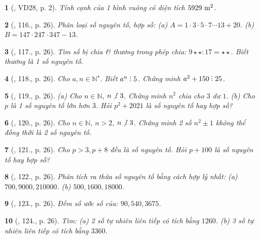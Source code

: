 \documentclass{article}
\newtheorem{baitoan}{}
\DeclareRobustCommand{\divby}{%
	\mathrel{\vbox{\baselineskip.65ex\lineskiplimit0pt\hbox{.}\hbox{.}\hbox{.}}}%
}
\begin{document}
\begin{baitoan}[\cite{Tuyen_Toan_6}, VD28, p. 2]
	Tính cạnh của 1 hình vuông có diện tích $\rm5929\ m^2$.
\end{baitoan}

\begin{baitoan}[\cite{Tuyen_Toan_6}, 116., p. 26]
	Phân loại số nguyên tố, hợp số: (a) $A = 1\cdot3\cdot5\cdot7\cdots13 + 20$. (b) $B = 147\cdot247\cdot347 - 13$.
\end{baitoan}

\begin{baitoan}[\cite{Tuyen_Toan_6}, 117., p. 26]
	Tìm số bị chia \& thương trong phép chia: $9\star\star:17 = \star\star$. Biết thương là 1 số nguyên tố.
\end{baitoan}

\begin{baitoan}[\cite{Tuyen_Toan_6}, 118., p. 26]
	Cho $a,n\in\mathbb{N}^\star$. Biết $a^n\divby5$. Chứng minh $a^2 + 150\divby25$.
\end{baitoan}

\begin{baitoan}[\cite{Tuyen_Toan_6}, 119., p. 26]
	(a) Cho $n\in\mathbb{N}$, $n\not{\divby}\ 3$. Chứng minh $n^2$ chia cho $3$ dư $1$. (b) Cho $p$ là 1 số nguyên tố lớn hơn $3$. Hỏi $p^2 + 2021$ là số nguyên tố hay hợp số?
\end{baitoan}

\begin{baitoan}[\cite{Tuyen_Toan_6}, 120., p. 26]
	Cho $n\in\mathbb{N}$, $n > 2$, $n\not{\divby}\ 3$. Chứng minh 2 số $n^2\pm1$ không thể đồng thời là 2 số nguyên tố.
\end{baitoan}

\begin{baitoan}[\cite{Tuyen_Toan_6}, 121., p. 26]
	Cho $p > 3,p + 8$ đều là số nguyên tố. Hỏi $p + 100$ là số nguyên tố hay hợp số?
\end{baitoan}

\begin{baitoan}[\cite{Tuyen_Toan_6}, 122., p. 26]
	Phân tích ra thừa số nguyên tố bằng cách hợp lý nhất: (a) $700,9000,210000$. (b) $500,1600,18000$.
\end{baitoan}

\begin{baitoan}[\cite{Tuyen_Toan_6}, 123., p. 26]
	Đếm số ước số của: $90,540,3675$.
\end{baitoan}

\begin{baitoan}[\cite{Tuyen_Toan_6}, 124., p. 26]
	Tìm: (a) 2 số tự nhiên liên tiếp có tích bằng $1260$. (b) 3 số tự nhiên liên tiếp có tích bằng $3360$.
\end{baitoan}
\end{document}
